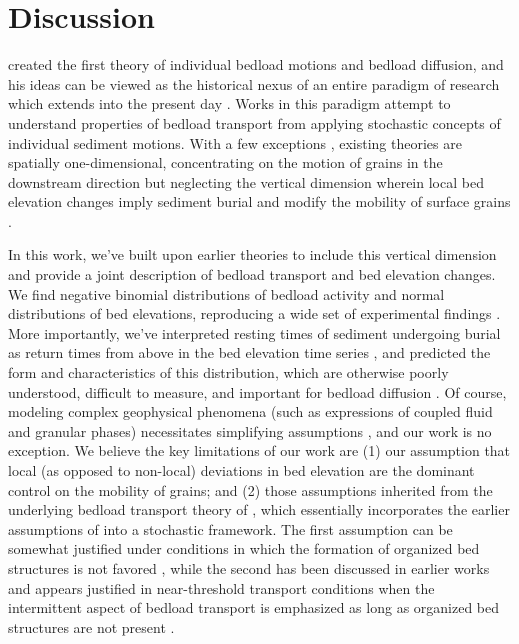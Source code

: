 \documentclass[draft]{agujournal2018}
\begin{document}
\section{Discussion}

\citet{Einstein1937} created the first theory of individual bedload motions and bedload diffusion, and his ideas can be viewed as the historical nexus of an entire paradigm of research which extends into the present day \citep[e.g.][]{Hubbell1964, Nakagawa1976,Hassan1991,Ancey2008, Wu2019}.
Works in this paradigm attempt to understand properties of bedload transport from applying stochastic concepts of individual sediment motions.
With a few exceptions \citep[e.g.][]{Yang1971,Nakagawa1980,Wu2019}, existing theories are spatially one-dimensional, concentrating on the motion of grains in the downstream direction but neglecting the vertical dimension wherein local bed elevation changes imply sediment burial \citep[e.g.][]{Voepel2013,Martin2014} and modify the mobility of surface grains \citep[e.g.][]{Yang1971,Nakagawa1980}.

In this work, we've built upon earlier theories \citep[e.g.][]{Ancey2008,Martin2014} to include this vertical dimension and provide a joint description of bedload transport and bed elevation changes.
We find negative binomial distributions of bedload activity and normal distributions of bed elevations, reproducing a wide set of experimental findings \citep{Ancey2008, Heyman2016, Wong2007, Singh2009, Martin2014}.
More importantly, we've interpreted resting times of sediment undergoing burial as return times from above in the bed elevation time series \citep[e.g.][]{Voepel2013,Martin2014}, and predicted the form and characteristics of this distribution, which are otherwise poorly understood, difficult to measure, and important for bedload diffusion \citep[e.g.][]{Voepel2013,Martin2014,Bradley2017}.
Of course, modeling complex geophysical phenomena (such as expressions of coupled fluid and granular phases) necessitates simplifying assumptions \citep[e.g.][]{Larsen2016}, and our work is no exception.
We believe the key limitations of our work are (1) our assumption that local (as opposed to non-local) deviations in bed elevation are the dominant control on the mobility of grains; and (2) those assumptions inherited from the underlying bedload transport theory of \citet{Ancey2008}, which essentially incorporates the earlier assumptions of \citet{Einstein1950} into a stochastic framework.
The first assumption can be somewhat justified under conditions in which the formation of organized bed structures is not favored \citep[e.g.][]{Hassan2008}, while the second has been discussed in earlier works and appears justified in near-threshold transport conditions when the intermittent aspect of bedload transport is emphasized \citep[e.g.][]{Ancey2008} as long as organized bed structures are not present \citep[e.g.][]{Dhont2018}.
\end{document}
